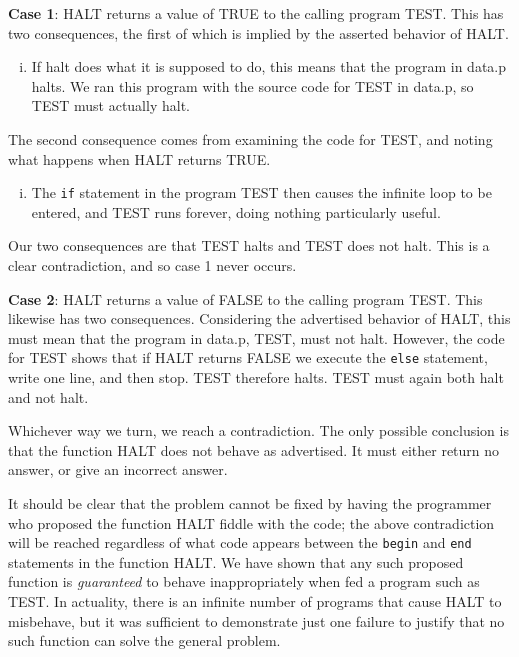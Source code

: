 \textbf{Case 1}: HALT returns a value of TRUE to the calling program TEST. This has
two consequences, the first of which is implied by the asserted behavior of HALT.
\begin{enumerate}[i.]
\item If halt does what it is supposed to do, this means that the program in
data.p halts. We ran this program with the source code for TEST in data.p, so
TEST must actually halt.
\end{enumerate}
The second consequence comes from examining the code for TEST, and noting
what happens when HALT returns TRUE.
\begin{enumerate}[i.]
\addtocounter{enumi}{1}
\item The {\tt if} statement in the program TEST then causes the infinite loop
to be entered, and TEST runs forever, doing nothing particularly useful.
\end{enumerate}
Our two consequences are that TEST halts and TEST does not halt. This is a
clear contradiction, and so case 1 never occurs.

\textbf{Case 2}: HALT returns a value of FALSE to the calling program TEST. This
likewise has two consequences. Considering the advertised behavior of HALT, this
must mean that the program in data.p, TEST, must not halt. However, the code for
TEST shows that if HALT returns FALSE we execute the {\tt else} statement, write one
line, and then stop. TEST therefore halts. TEST must again both halt and not
halt.

Whichever way we turn, we reach a contradiction. The only possible conclusion
is that the function HALT does not behave as advertised. It must either return
no answer, or give an incorrect answer.

It should be clear that the problem cannot be fixed by having the programmer who
proposed the function HALT fiddle with the code; the above contradiction will be
reached regardless of what code appears between the {\tt begin} and {\tt end}
statements in the function HALT. We have shown that any such proposed function
is \emph{guaranteed} to behave inappropriately when fed a program such as TEST. In
actuality, there is an infinite number of programs that cause HALT to misbehave,
but it was sufficient to demonstrate just one failure to justify that no such
function can solve the general problem.

